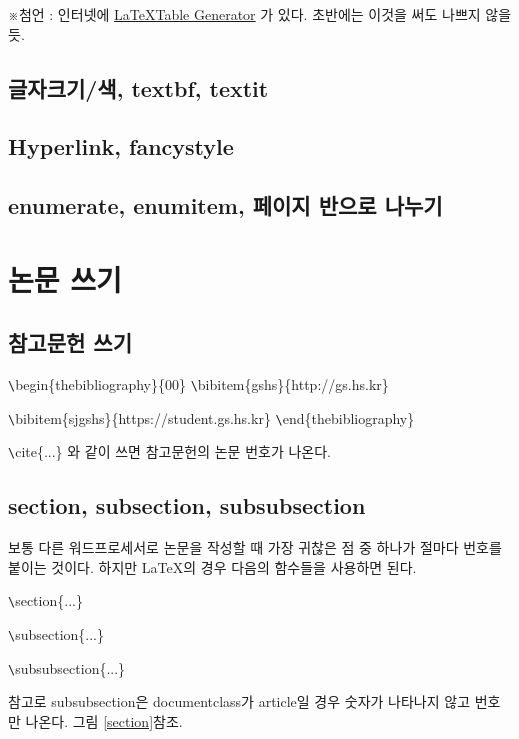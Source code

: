 \documentclass[11pt]{article}
\begin{document}
※첨언 : 인터넷에 \href{www.tablesgenerator.com}{\LaTeX Table Generator} 가 있다. 초반에는 이것을 써도 나쁘지 않을 듯. 

\subsection{글자크기/색, textbf, textit}
\subsection{Hyperlink, fancystyle}

\subsection{enumerate, enumitem, 페이지 반으로 나누기}

\section{논문 쓰기}

\subsection{참고문헌 쓰기}
\begin{center}
\verb+\+begin\{thebibliography\}\{00\}
\verb+\+bibitem\{gshs\}\{http://gs.hs.kr\}

\verb+\+bibitem\{sjgshs\}\{https://student.gs.hs.kr\}
\verb+\+end\{thebibliography\}
\end{center}
\verb+\+cite\{...\} 와 같이 쓰면 참고문헌의 논문 번호가 나온다.

\subsection{section, subsection, subsubsection}
보통 다른 워드프로세서로 논문을 작성할 때 가장 귀찮은 점 중 하나가 절마다 번호를 붙이는 것이다. 하지만 \LaTeX 의 경우 다음의 함수들을 사용하면 된다.

\begin{center}
\verb+\+section\{...\}

\verb+\+subsection\{...\}

\verb+\+subsubsection\{...\}
\end{center}

참고로 subsubsection은 documentclass가 article일 경우 숫자가 나타나지 않고 번호만 나온다. 그림 \ref{section}참조.
\end{document}
